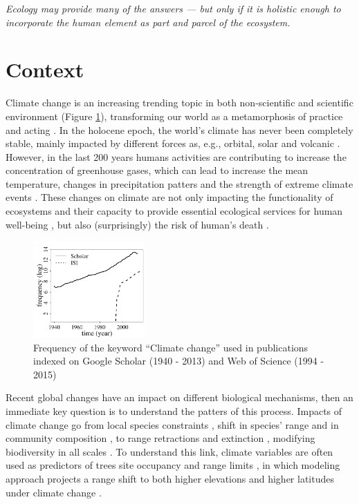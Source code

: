 
\begin{displayquote}
\centering\textit{Ecology may provide many of the answers — but only if it is holistic enough to incorporate the human element as part and parcel of the ecosystem.} \\ 
\end{displayquote}

\section{Context}

Climate change is an increasing trending topic in both non-scientific \parencite{Capstick2015} and scientific environment (Figure \ref{fig:fig1}), transforming our world as a metamorphosis of practice and acting \parencite{Beck2016}.
In the holocene epoch, the world's climate has never been completely stable, mainly impacted by different forces as, e.g., orbital, solar and volcanic \parencite{Wanner2008}.
However, in the last 200 years humans activities are contributing to increase the concentration of greenhouse gases, which can lead to increase the mean temperature, changes in precipitation patters and the strength of extreme climate events \parencite{Cubasch2013}.
These changes on climate are not only impacting the functionality of ecosystems and their capacity to provide essential ecological services for human well-being \parencite{Cardinale2012}, but also (surprisingly) the risk of human's death \parencite{Mora2017}.

\begin{figure}
    \centering
    \includegraphics[width=0.38\textwidth]{img/fig1_em.pdf}
    \caption{Frequency of the keyword ``Climate change'' used in publications indexed on Google Scholar (1940 - 2013) and Web of Science (1994 - 2015)}
    \label{fig:fig1}
\end{figure}

Recent global changes have an impact on different biological mechanisms, then an immediate key question is to understand the patters of this process.
Impacts of climate change go from local species constraints \parencite[e.g. low regeneration;][]{Treyger2011}, shift in species' range \parencite{Boisvert-Marsh2014,Monleon2015} and in community composition \parencite{Dieleman2015}, to range retractions and extinction \parencite{Thomas2006}, modifying biodiversity in all scales \parencite{Penuelas2013}.
To understand this link, climate variables are often used as predictors of trees site occupancy \parencite{Canham2010} and range limits \parencite{Morin2015}, in which modeling approach projects a range shift to both higher elevations and higher latitudes under climate change \parencite{Chen2011}.

